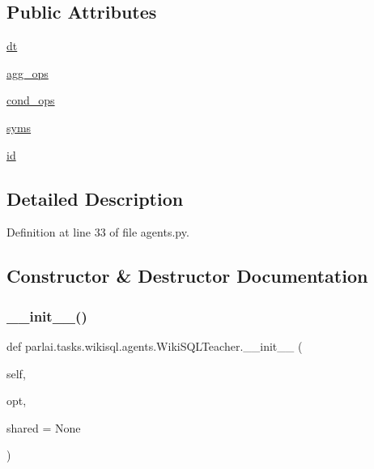 \subsection*{Public Attributes}
\begin{DoxyCompactItemize}
\item 
\hyperlink{classparlai_1_1tasks_1_1wikisql_1_1agents_1_1WikiSQLTeacher_a343d704bea4fc5c096000b73b2796e03}{dt}
\item 
\hyperlink{classparlai_1_1tasks_1_1wikisql_1_1agents_1_1WikiSQLTeacher_acac9910a97f5b0ee9af7e9bd8a7e2d78}{agg\+\_\+ops}
\item 
\hyperlink{classparlai_1_1tasks_1_1wikisql_1_1agents_1_1WikiSQLTeacher_a8d6572adccf79dd778ec80ec14647980}{cond\+\_\+ops}
\item 
\hyperlink{classparlai_1_1tasks_1_1wikisql_1_1agents_1_1WikiSQLTeacher_a1a67c761791a412586131dd7dd595a7c}{syms}
\item 
\hyperlink{classparlai_1_1tasks_1_1wikisql_1_1agents_1_1WikiSQLTeacher_aec62053f23dd71f7db3997534f631136}{id}
\end{DoxyCompactItemize}


\subsection{Detailed Description}


Definition at line 33 of file agents.\+py.



\subsection{Constructor \& Destructor Documentation}
\mbox{\label{classparlai_1_1tasks_1_1wikisql_1_1agents_1_1WikiSQLTeacher_afabbebdbb464879554723b2b3af62493}} 
\subsubsection{\texorpdfstring{\+\_\+\+\_\+init\+\_\+\+\_\+()}{\_\_init\_\_()}}
{\footnotesize\ttfamily def parlai.\+tasks.\+wikisql.\+agents.\+Wiki\+S\+Q\+L\+Teacher.\+\_\+\+\_\+init\+\_\+\+\_\+ (\begin{DoxyParamCaption}\item[{}]{self,  }\item[{}]{opt,  }\item[{}]{shared = {\ttfamily None} }\end{DoxyParamCaption})}




